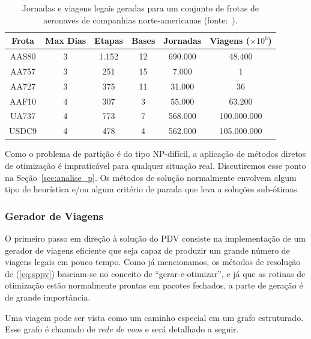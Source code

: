 \documentclass[12pt,a4paper]{article}
\begin{document}
\begin{table}[ht]
	\begin{center}
		\begin{tabular}{|c||c|c|c|c|c|}
			\hline
			{\bf Frota} & {\bf Max Dias} & {\bf Etapas} & {\bf Bases} & {\bf Jornadas} & 
			{\bf Viagens} ($\times 10^6$) \\
			\hline
			AAS80 & 3 & 1.152 & 12 & 690.000 & 48.400 \\
			\hline
			AA757 & 3 & 251 & 15 & 7.000 & 1 \\
			\hline
			AA727 & 3 & 375 & 11 & 31.000 & 36 \\
			\hline
			AAF10 & 4 & 307 & 3 & 55.000 & 63.200 \\
			\hline 
			UA737 & 4 & 773 & 7 & 568.000 & 100.000.000 \\
			\hline
			USDC9 & 4 & 478 & 4 & 562.000 & 105.000.000 \\
			\hline
		\end{tabular}
		\caption{Jornadas e viagens legais geradas para um conjunto de frotas de aeronaves de companhias
		norte-americanas (fonte:~\cite{anbil98}).}
		\label{tab:viagens}
	\end{center}
\end{table}

Como o problema de partição é do tipo NP-difícil, a aplicação de métodos diretos de otimização é
impraticável para qualquer situação real. Discutiremos esse ponto na Seção~\ref{sec:analise_p}. Os
métodos de solução normalmente envolvem algum tipo de heurística e/ou algum critério de parada que
leva a soluções sub-ótimas.


\subsubsection{Gerador de Viagens}
\label{sec:gerador_viagens}

O primeiro passo em direção à solução do PDV consiste na implementação de um gerador de viagens 
eficiente que seja capaz de produzir um grande número de viagens legais em pouco tempo. Como já
mencionamos, os métodos de resolução de (\ref{eq:sppv}) baseiam-se no conceito de 
``gerar-e-otimizar'', e já que as rotinas de otimização estão normalmente prontas em pacotes 
fechados, a parte de geração é de grande importância.

Uma viagem pode ser vista como um caminho especial em um grafo estruturado. Esse grafo é chamado de
\emph{rede de voos} e será detalhado a seguir. 
\end{document}

